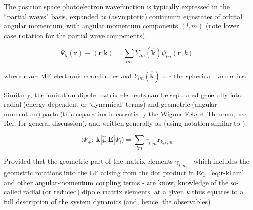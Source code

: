 \documentclass[10pt]{article}
\begin{document}
The position space photoelectron wavefunction is typically expressed in the ``partial waves" basis, expanded as (asymptotic) continuum eignstates of orbital angular momentum, with angular momentum components $(l,m)$ (note lower case notation for the partial wave components),  

\begin{equation}
\Psi_\mathbf{k}(\bm{r})\equiv\left<\bm{r}|\mathbf{k}\right> = \sum_{lm}Y_{lm}(\mathbf{\hat{k}})\psi_{lm}(\bm{r},k)
\label{eq:elwf}
\end{equation}

where $\bm{r}$ are MF electronic coordinates and $Y_{lm}(\mathbf{\hat{k}})$ are the spherical harmonics.

Similarly, the ionization dipole matrix elements can be separated generally into radial (energy-dependent or `dynamical' terms) and geometric (angular momentum) parts (this separation is essentially the Wigner-Eckart Theorem, see Ref. \cite{zareAngMom} for general discussion), and written generally as (using notation similar to \cite{Reid1991}): 

\begin{equation}
\langle\Psi_{+};\,\mathbf{k}|\hat{\mathbf{\mu}}.\boldsymbol{\mathbf{E}}|\Psi_{i}\rangle = \sum_{lm}\gamma_{l,m}\mathbf{r}_{k,l,m}
\label{eq:r-kllam}
\end{equation}


Provided that the geometric part of the matrix elements $\gamma_{l,m}$ - which includes the geometric rotations  into the LF arising from the dot product in Eq.~\ref{eq:r-kllam} and other angular-momentum coupling terms - are know, knowledge of the so-called radial (or reduced) dipole matrix elements, at a given 
$k$ %
thus equates to a full description of the system dynamics (and, hence, the observables).

\end{document}
